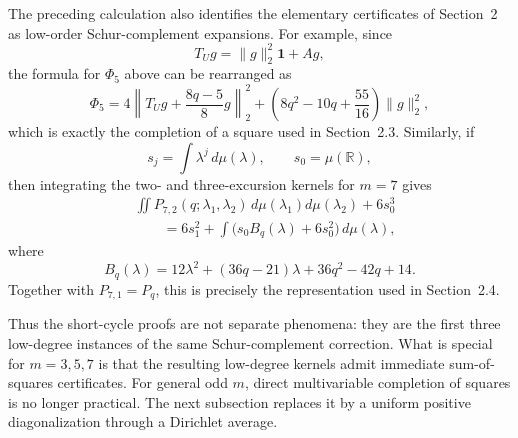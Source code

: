 \documentclass[11pt]{article}
\begin{document}
The preceding calculation also identifies the elementary certificates of
Section~2 as low-order Schur-complement expansions.  For example, since
\[
 T_Ug=\lVert g\rVert_2^2\mathbf 1+Ag,
\]
the formula for $\Phi_5$ above can be rearranged as
\[
 \Phi_5
 =4\left\lVert T_Ug+\frac{8q-5}{8}g\right\rVert_2^2
  +\left(8q^2-10q+\frac{55}{16}\right)\lVert g\rVert_2^2,
\]
which is exactly the completion of a square used in Section~2.3.
Similarly, if
\[
 s_j=\int \lambda^j\,d\mu(\lambda),
 \qquad s_0=\mu(\mathbb R),
\]
then integrating the two- and three-excursion kernels for $m=7$ gives
\[
 \begin{aligned}
 &\iint P_{7,2}(q;\lambda_1,\lambda_2)
 \,d\mu(\lambda_1)d\mu(\lambda_2)
 +6s_0^3\\
 &\qquad
 =6s_1^2+\int\bigl(s_0B_q(\lambda)+6s_0^2\bigr)\,d\mu(\lambda),
 \end{aligned}
\]
where
\[
 B_q(\lambda)
 =12\lambda^2+(36q-21)\lambda+36q^2-42q+14.
\]
Together with $P_{7,1}=P_q$, this is precisely the representation used in
Section~2.4.

Thus the short-cycle proofs are not separate phenomena: they are the first
three low-degree instances of the same Schur-complement correction.  What is
special for $m=3,5,7$ is that the resulting low-degree kernels admit immediate
sum-of-squares certificates.  For general odd $m$, direct multivariable
completion of squares is no longer practical.  The next subsection replaces
it by a uniform positive diagonalization through a Dirichlet average.
\end{document}
